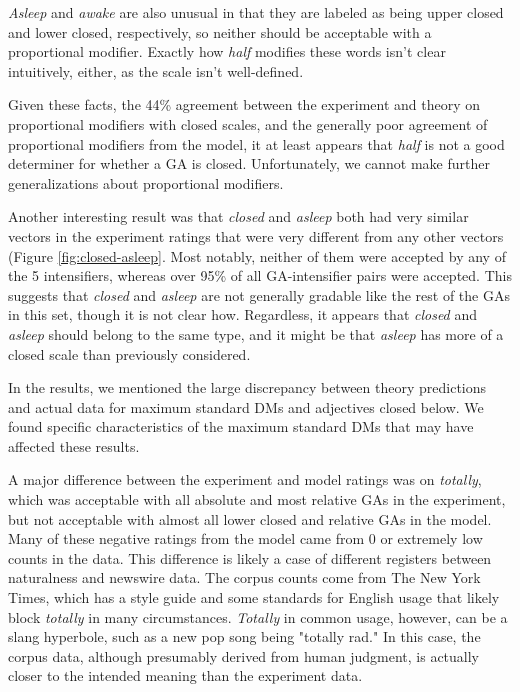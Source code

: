\documentclass[11pt]{article}
\begin{document}
\textit{Asleep} and \textit{awake} are also unusual in that they are labeled as being upper closed and lower closed, respectively, so neither should be acceptable with a proportional modifier. Exactly how \textit{half} modifies these words isn't clear intuitively, either, as the scale isn't well-defined.

Given these facts, the 44\% agreement between the experiment and theory on proportional modifiers with closed scales, and the generally poor agreement of proportional modifiers from the model, it at least appears that \textit{half} is not a good determiner for whether a GA is closed. Unfortunately, we cannot make further generalizations about proportional modifiers. 

Another interesting result was that \textit{closed} and \textit{asleep} both had very similar vectors in the experiment ratings that were very different from any other vectors (Figure \ref{fig:closed-asleep}. Most notably, neither of them were accepted by any of the 5 intensifiers, whereas over 95\% of all GA-intensifier pairs were accepted. This suggests that \textit{closed} and \textit{asleep} are not generally gradable like the rest of the GAs in this set, though it is not clear how. Regardless, it appears that \textit{closed} and \textit{asleep} should belong to the same type, and it might be that \textit{asleep} has more of a closed scale than previously considered.

In the results, we mentioned the large discrepancy between theory predictions and actual data for maximum standard DMs and adjectives closed below. We found specific characteristics of the maximum standard DMs that may have affected these results.

A major difference between the experiment and model ratings was on \textit{totally}, which was acceptable with all absolute and most relative GAs in the experiment, but not acceptable with almost all lower closed and relative GAs in the model. Many of these negative ratings from the model came from 0 or extremely low counts in the data. This difference is likely a case of different registers between naturalness and newswire data. The corpus counts come from The New York Times, which has a style guide and some standards for English usage that likely block \textit{totally} in many circumstances. \textit{Totally} in common usage, however, can be a slang hyperbole, such as a new pop song being "totally rad." In this case, the corpus data, although presumably derived from human judgment, is actually closer to the intended meaning than the experiment data.
\end{document}
